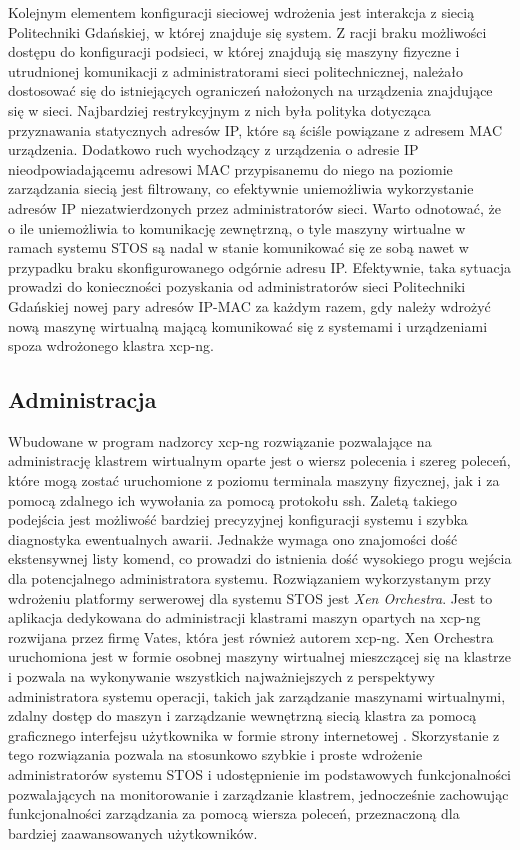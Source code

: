 \noindent Kolejnym elementem konfiguracji sieciowej wdrożenia jest interakcja z siecią Politechniki Gdańskiej, w której znajduje się system. Z racji braku możliwości dostępu do konfiguracji podsieci, w której znajdują się maszyny fizyczne i utrudnionej komunikacji z administratorami sieci politechnicznej, należało dostosować się do istniejących ograniczeń nałożonych na urządzenia znajdujące się w sieci. Najbardziej restrykcyjnym z nich była polityka dotycząca przyznawania statycznych adresów IP, które są ściśle powiązane z adresem MAC urządzenia. Dodatkowo ruch wychodzący z urządzenia o adresie IP nieodpowiadającemu adresowi MAC przypisanemu do niego na poziomie zarządzania siecią jest filtrowany, co efektywnie uniemożliwia wykorzystanie adresów IP niezatwierdzonych przez administratorów sieci. Warto odnotować, że o ile uniemożliwia to komunikację zewnętrzną, o tyle maszyny wirtualne w ramach systemu STOS są nadal w stanie komunikować się ze sobą nawet w przypadku braku skonfigurowanego odgórnie adresu IP. Efektywnie, taka sytuacja prowadzi do konieczności pozyskania od administratorów sieci Politechniki Gdańskiej nowej pary adresów IP-MAC za każdym razem, gdy należy wdrożyć nową maszynę wirtualną mającą komunikować się z systemami i urządzeniami spoza wdrożonego klastra xcp-ng.
\subsection{Administracja}
Wbudowane w program nadzorcy xcp-ng rozwiązanie pozwalające na administrację klastrem wirtualnym oparte jest o wiersz polecenia i szereg poleceń, które mogą zostać uruchomione z poziomu terminala maszyny fizycznej, jak i za pomocą zdalnego ich wywołania za pomocą protokołu ssh. Zaletą takiego podejścia jest możliwość bardziej precyzyjnej konfiguracji systemu i szybka diagnostyka ewentualnych awarii. Jednakże wymaga ono znajomości dość ekstensywnej listy komend, co prowadzi do istnienia dość wysokiego progu wejścia dla potencjalnego administratora systemu. 
\noindent Rozwiązaniem wykorzystanym przy wdrożeniu platformy serwerowej dla systemu STOS jest \textit{Xen Orchestra}. Jest to aplikacja dedykowana do administracji klastrami maszyn opartych na xcp-ng rozwijana przez firmę Vates, która jest również autorem xcp-ng. Xen Orchestra uruchomiona jest w formie osobnej maszyny wirtualnej mieszczącej się na klastrze i pozwala na wykonywanie wszystkich najważniejszych z perspektywy administratora systemu operacji, takich jak zarządzanie maszynami wirtualnymi, zdalny dostęp do maszyn i zarządzanie wewnętrzną siecią klastra za pomocą graficznego interfejsu użytkownika w formie strony internetowej \cite{xoa}. Skorzystanie z tego rozwiązania pozwala na stosunkowo szybkie i proste wdrożenie administratorów systemu STOS i udostępnienie im podstawowych funkcjonalności pozwalających na monitorowanie i zarządzanie klastrem, jednocześnie zachowując funkcjonalności zarządzania za pomocą wiersza poleceń, przeznaczoną dla bardziej zaawansowanych użytkowników.
